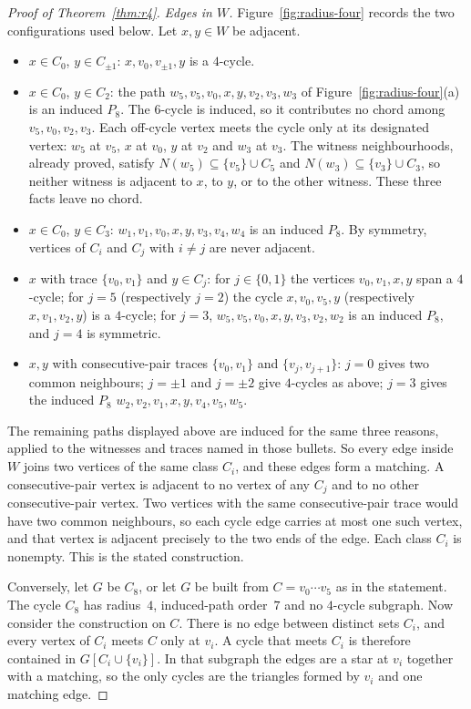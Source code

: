 \documentclass[ASNA]{USG}
\theoremstyle{WBstyletwo}
\numberwithin{equation}{section}
\begin{document}
\begin{proof}[Proof of Theorem~\ref{thm:r4}]
\emph{Edges in $W$.} Figure~\ref{fig:radius-four} records the two configurations used below. Let $x,y\in W$ be adjacent.
\begin{itemize}
\item $x\in C_0$, $y\in C_{\pm 1}$: $x,v_0,v_{\pm 1},y$ is a $4$-cycle.
\item $x\in C_0$, $y\in C_2$: the path $w_5,v_5,v_0,x,y,v_2,v_3,w_3$ of Figure~\ref{fig:radius-four}(a) is an induced $P_8$. The $6$-cycle is induced, so it contributes no chord among $v_5,v_0,v_2,v_3$. Each off-cycle vertex meets the cycle only at its designated vertex: $w_5$ at $v_5$, $x$ at $v_0$, $y$ at $v_2$ and $w_3$ at $v_3$. The witness neighbourhoods, already proved, satisfy $N(w_5)\subseteq\{v_5\}\cup C_5$ and $N(w_3)\subseteq\{v_3\}\cup C_3$, so neither witness is adjacent to $x$, to $y$, or to the other witness. These three facts leave no chord.
\item $x\in C_0$, $y\in C_3$: $w_1,v_1,v_0,x,y,v_3,v_4,w_4$ is an induced $P_8$. By symmetry, vertices of $C_i$ and $C_j$ with $i\ne j$ are never adjacent.
\item $x$ with trace $\{v_0,v_1\}$ and $y\in C_j$: for $j\in\{0,1\}$ the vertices $v_0,v_1,x,y$ span a $4$-cycle; for $j=5$ (respectively $j=2$) the cycle $x,v_0,v_5,y$ (respectively $x,v_1,v_2,y$) is a $4$-cycle; for $j=3$, $w_5,v_5,v_0,x,y,v_3,v_2,w_2$ is an induced $P_8$, and $j=4$ is symmetric.
\item $x,y$ with consecutive-pair traces $\{v_0,v_1\}$ and $\{v_j,v_{j+1}\}$: $j=0$ gives two common neighbours; $j=\pm 1$ and $j=\pm 2$ give $4$-cycles as above; $j=3$ gives the induced $P_8$ $w_2,v_2,v_1,x,y,v_4,v_5,w_5$.
\end{itemize}
The remaining paths displayed above are induced for the same three reasons, applied to the witnesses and traces named in those bullets. So every edge inside $W$ joins two vertices of the same class $C_i$, and these edges form a matching. A consecutive-pair vertex is adjacent to no vertex of any $C_j$ and to no other consecutive-pair vertex. Two vertices with the same consecutive-pair trace would have two common neighbours, so each cycle edge carries at most one such vertex, and that vertex is adjacent precisely to the two ends of the edge. Each class $C_i$ is nonempty. This is the stated construction.

Conversely, let $G$ be $C_8$, or let $G$ be built from $C=v_0\cdots v_5$ as in the statement. The cycle $C_8$ has radius~$4$, induced-path order~$7$ and no $4$-cycle subgraph. Now consider the construction on $C$. There is no edge between distinct sets $C_i$, and every vertex of $C_i$ meets $C$ only at $v_i$. A cycle that meets $C_i$ is therefore contained in $G[C_i\cup\{v_i\}]$. In that subgraph the edges are a star at $v_i$ together with a matching, so the only cycles are the triangles formed by $v_i$ and one matching edge.


\end{proof}
\end{document}
